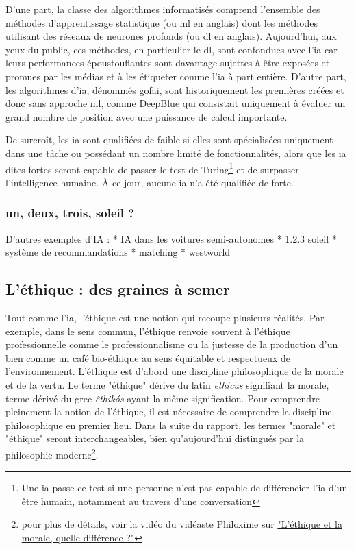 D'une part, la classe des algorithmes informatisés comprend l'ensemble des méthodes d'apprentissage statistique (ou \gls{ml} en anglais) dont les méthodes utilisant des réseaux de neurones profonds (ou \gls{dl} en anglais). Aujourd'hui, aux yeux du public, ces méthodes, en particulier le \gls{dl}, sont confondues avec l'\gls{ia} car leurs performances époustouflantes sont davantage sujettes à être exposées et promues par les médias et à les étiqueter comme l'\gls{ia} à part entière. D'autre part, les algorithmes d'\gls{ia}, dénommés \gls{gofai}, sont historiquement les premières créées et donc sans approche \gls{ml}, comme DeepBlue qui consistait uniquement à évaluer un grand nombre de position avec une puissance de calcul importante.

De surcroît, les \gls{ia} sont qualifiées de faible si elles sont spécialisées uniquement dans une tâche ou possédant un nombre limité de fonctionnalités, alors que les \gls{ia} dites fortes seront capable de passer le test de Turing\footnote{Une \gls{ia} passe ce test si une personne n'est pas capable de différencier l'\gls{ia} d'un être humain, notamment au travers d'une conversation} et de surpasser l'intelligence humaine. À ce jour, aucune \gls{ia} n'a été qualifiée de forte.

\subsubsection{un, deux, trois, soleil ?}


D'autres exemples d'IA :
* IA dans les voitures semi-autonomes
* 1.2.3 soleil
* système de recommandations
* matching
* westworld




\subsection{L'éthique : des graines à semer}\label{subsection:ethique}

Tout comme l'\gls{ia}, l'éthique est une notion qui recoupe plusieurs réalités. Par exemple, dans le sens commun, l'éthique renvoie souvent à l'éthique professionnelle comme le professionnalisme ou la justesse de la production d'un bien comme un café bio-éthique au sens équitable et respectueux de l'environnement.
L'éthique est d'abord une discipline philosophique de la morale et de la vertu. Le terme "éthique" dérive du latin \textit{ethicus} signifiant la morale, terme dérivé du grec \textit{êthikós} ayant la même signification. Pour comprendre pleinement la notion de l'éthique, il est nécessaire de comprendre la discipline philosophique en premier lieu. Dans la suite du rapport, les termes "morale" et "éthique" seront interchangeables, bien qu'aujourd'hui distingués par la philosophie moderne\footnote{pour plus de détails, voir la vidéo du vidéaste Philoxime sur  \href{https://tournesol.app/entities/yt:HTAXqpMKm8M}{"L'éthique et la morale, quelle différence ?"}}.

